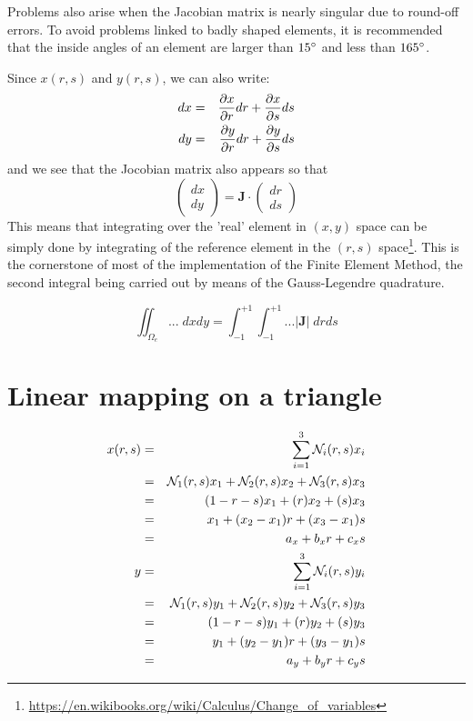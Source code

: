 \begin{remark}
Problems also arise when the Jacobian matrix is nearly singular due to round-off errors.
To avoid problems linked to badly shaped elements, it is recommended that the inside
angles of an element are larger than $15\degree$ and less than $165\degree$.
\end{remark}

Since $x(r,s)$ and $y(r,s)$, we can also write:
\begin{eqnarray}
dx &=& \frac{\partial x}{\partial r} dr + \frac{\partial x}{\partial s} ds \nonumber\\
dy &=& \frac{\partial y}{\partial r} dr + \frac{\partial y}{\partial s} ds \nonumber
\end{eqnarray}
and we see that the Jocobian matrix also appears so that 
\begin{equation}
\left(
\begin{array}{c}
dx \\ dy
\end{array}
\right)
={\bm J}\cdot
\left(
\begin{array}{c}
dr \\ ds
\end{array}
\right)
\end{equation}
This means that integrating over the 'real' element in $(x,y)$ space
can be simply done by integrating of the reference element in the 
$(r,s)$ space\footnote{\url{https://en.wikibooks.org/wiki/Calculus/Change_of_variables}}. 
This is the cornerstone of most of the implementation of the 
Finite Element Method, the second integral being carried out by means 
of the Gauss-Legendre quadrature.

\begin{equation}
\iint_{\Omega_e} ... \; dx dy = \int_{-1}^{+1} \int_{-1}^{+1} ...|{\bm J}| \; dr ds
\end{equation}




\section{Linear mapping on a triangle}

\begin{eqnarray}
x(r,s) 
&=& \sum_{i=1}^3 {\mathcal{N}}_i(r,s) x_i \nonumber\\
&=& {\mathcal{N}}_1(r,s) x_1 +{\mathcal{N}}_2(r,s) x_2 +{\mathcal{N}}_3(r,s) x_3   \nonumber\\
&=&  (1-r-s) x_1 +(r) x_2  +(s) x_3   \nonumber\\
&=& x_1 + (x_2-x_1) r + (x_3-x_1)s \nonumber\\
&=& a_x + b_x r + c_x s \nonumber\\
y 
&=& \sum_{i=1}^3 {\mathcal{N}}_i(r,s) y_i \nonumber\\
&=& {\mathcal{N}}_1(r,s) y_1 +{\mathcal{N}}_2(r,s) y_2 +{\mathcal{N}}_3(r,s) y_3   \nonumber\\
&=&  (1-r-s) y_1 +(r) y_2  +(s) y_3   \nonumber\\
&=& y_1 + (y_2-y_1) r + (y_3-y_1)s \nonumber\\
&=& a_y+ b_y r + c_y s \nonumber 
\end{eqnarray}

